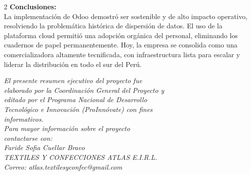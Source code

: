 \documentclass[12pt]{article}
\begin{document}
\begin{multicols}{2}
\textbf{Conclusiones:}\\
La implementación de Odoo demostró ser sostenible y de alto impacto operativo, resolviendo la problemática histórica de dispersión de datos. El uso de la plataforma cloud permitió una adopción orgánica del personal, eliminando los cuadernos de papel permanentemente. Hoy, la empresa se consolida como una comercializadora altamente tecnificada, con infraestructura lista para escalar y liderar la distribución en todo el sur del Perú.

\vspace{0.4cm}
\noindent
\scriptsize
\renewcommand{\arraystretch}{1.15}
\setlength{\tabcolsep}{3pt}
\normalsize

\vspace{0.25cm}
\begin{center}
\scriptsize\itshape
El presente resumen ejecutivo del proyecto fue\\
elaborado por la Coordinación General del Proyecto y\\
editado por el Programa Nacional de Desarrollo\\
Tecnológico e Innovación (ProInnóvate) con fines\\
informativos.\\[0.2cm]
Para mayor información sobre el proyecto\\
contactarse con:\\
Faride Sofia Cuellar Bravo\\
TEXTILES Y CONFECCIONES ATLAS E.I.R.L.\\
Correo: atlas.textilesyconfec@gmail.com
\end{center}
\end{multicols}
\end{document}
